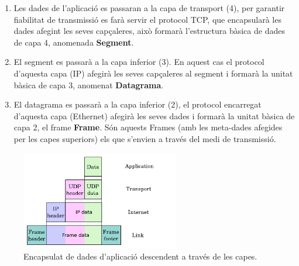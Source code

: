 \documentclass[12pt,a4paper]{article}
\begin{document}
\begin{enumerate}
 \item Les dades de l'aplicació es passaran a la capa de transport (4), per garantir fiabilitat de transmissió es farà servir el protocol TCP, que encapsularà les dades afegint les seves capçaleres, això formarà l'estructura bàsica de dades de capa 4, anomenada \textbf{Segment}. 
 \item El segment es passarà a la capa inferior (3). En aquest cas el protocol d'aquesta capa (IP) afegirà les seves capçaleres al segment i formarà la unitat bàsica de capa 3, anomenat \textbf{Datagrama}.
 \item El datagrama es passarà a la capa inferior (2), el protocol encarregat d'aquesta capa (Ethernet) afegirà les seves dades i formarà la unitat bàsica de capa 2, el frame \textbf{Frame}.  Són aquests Frames (amb les meta-dades afegides per les capes superiors) els que s'envien a través del medi de transmissió. 
  
\end{enumerate}

\begin{figure}[!ht]
  \begin{center}
    \includegraphics[width=0.615\textwidth]{encapsulation}
     \caption{Encapsulat de dades d'aplicació descendent a través de les capes.}
    \label{encapsulation}
  \end{center}
\end{figure}
\end{document}
